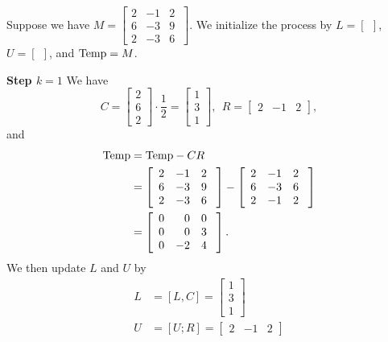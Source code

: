 Suppose we have $M=\left[ \begin{array}{rrr} 2 & -1 & 2\\
 6 & -3& 9 \\ 2 & -3 & 6  \end{array}\ \right].$ We initialize the process by $L=[~~]$, $U=[~~]$, and ${\rm Temp}=M$. 
 
 \textbf{Step $k=1$}  We have
 $$C=  \left[\begin{array}{r} 2 \\ 6 \\ 2 \end{array} \right] \cdot \frac{1}{2} =\left[\begin{array}{r} 1 \\ 3 \\ 1 \end{array} \right] ,~~R=\left[\begin{array}{rrr} 2 & -1 & 2 \end{array} \right], $$
 and
\begin{align*}
    {\rm Temp}&  =  {\rm Temp} -  CR \medskip\\ 
 &=\left[ \begin{array}{rrr} 2 & -1 & 2\\
 6 & -3& 9 \\ 2 & -3 & 6  \end{array}\ \right] -  \left[ \begin{array}{rrr} 2 & -1 & 2\\
 6 & -3& 6 \\ 2 & -1 & 2  \end{array}\ \right]\\
 &=  \left[ \begin{array}{rrr} 0 & 0 & 0\\
 0 & 0& 3 \\0 &-2 & 4  \end{array}\ \right].
\end{align*}
We then update $L$ and $U$ by
\begin{align*}
L&= [L,C]=\left[\begin{array}{r} 1 \\ 3 \\ 1 \end{array} \right] \\
U&= [U;R]= \left[\begin{array}{rrr} 2 & -1 & 2 \end{array} \right] \\
\end{align*}

